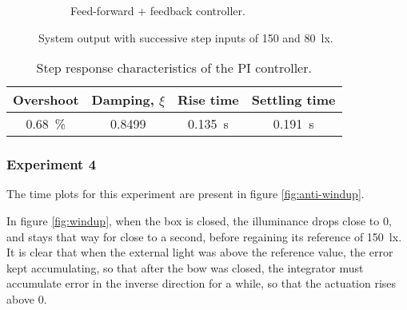 \documentclass[english,fira]{ist-report}
\begin{document}
\begin{figure}[ht]
\begin{subfigure}[b]{\linewidth}
        \centering
        \caption{Feed-forward + feedback controller.}
        \label{fig:contr-response}
    \end{subfigure}
    \caption{System output with successive step inputs of \SI{150}{} and \SI{80}{\lux}.}
    \label{fig:controllers}
\end{figure}

\begin{table}[ht]
    \centering
    \begin{tabular}{cccc}\toprule
         Overshoot & Damping, $\xi$ & Rise time & Settling time  \tabularnewline
        \midrule
         \SI{0.68}{\percent} & \SI{0.8499}{} & \SI{0.135}{\second} & \SI{0.191}{\second} \tabularnewline
        \bottomrule
    \end{tabular}
    \caption{Step response characteristics of the PI controller.}
    \label{tab:controller-characteristics}
\end{table}

\subsubsection*{Experiment 4}

The time plots for this experiment are present in figure \ref{fig:anti-windup}. 

In figure \ref{fig:windup}, when the box is closed, the illuminance drops close to $0$, and stays that way for close to a second, before regaining its reference of \SI{150}{\lux}. 
It is clear that when the external light was above the reference value, the error kept accumulating, so that after the bow was closed, the integrator must accumulate error in the inverse direction for a while, so that the actuation rises above $0$.
\end{document}
